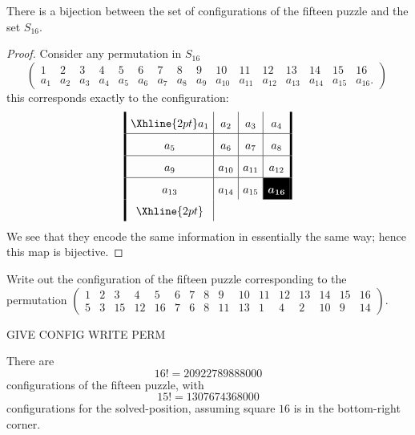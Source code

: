 \documentclass{ximera}
\begin{document}
\begin{lemma}
  There is a bijection between the set of configurations of the
  fifteen puzzle and the set $S_{16}$.
  \begin{proof}
    Consider any permutation in $S_{16}$
    \[
    \left(\begin{smallmatrix}
      1 & 2 & 3 & 4 & 5 & 6 & 7 & 8 & 9 & 10 & 11 & 12 & 13 & 14 & 15 & 16\\
      a_1 & a_2 & a_3 & a_4 & a_5 & a_6 & a_7 & a_8 & a_9 & a_{10} & a_{11} & a_{12} & a_{13} & a_{14} & a_{15} & a_{16}.
\end{smallmatrix}\right)\
    \]
    this corresponds exactly to the configuration:
    \[
    \arraycolsep=4pt\def\arraystretch{1.6}
    \begin{array}{!{\vline width 2pt}c|c|c|c!{\vline width 2pt}}
      \Xhline{2pt}
      a_1  & a_2  & a_3  & a_4 \\ \hline
      a_5  & a_6  & a_7  & a_8 \\ \hline
      a_9  & a_{10} & a_{11} & a_{12} \\ \hline
      a_{13} & a_{14} & a_{15} & \cellcolor{black}\textcolor{white}{\boldsymbol{a_{16}}} \\
      \Xhline{2pt}
    \end{array}
    \]
    We see that they encode the same information in essentially the
    same way; hence this map is bijective.
  \end{proof}
\end{lemma}

\begin{exercise}
  Write out the configuration of the fifteen puzzle corresponding to
  the permutation $\left(\begin{smallmatrix}
    1 & 2 & 3 & 4 & 5 & 6 & 7 & 8 & 9 & 10 & 11 & 12 & 13 & 14 & 15 & 16\\
    5 & 3 & 15& 12& 16& 7  & 6 & 8 & 11 & 13 &  1 & 4 & 2 & 10  & 9 & 14
  \end{smallmatrix}\right)$.
\end{exercise}

\begin{exercise}
  GIVE CONFIG WRITE PERM
\end{exercise}


\begin{corollary}
  There are
  \[
  16! = 20922789888000
  \]
  configurations of the fifteen puzzle, with
  \[
  15!=1307674368000
  \]
  configurations for the solved-position, assuming square $16$ is in
  the bottom-right corner.
\end{corollary}
\end{document}
